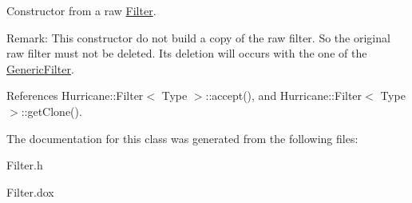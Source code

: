 Constructor from a raw \hyperlink{classHurricane_1_1Filter}{Filter}.

\begin{DoxyParagraph}{Remark\+:}
This constructor do not build a copy of the raw filter. So the original raw filter must not be deleted. It\textquotesingle{}s deletion will occurs with the one of the \hyperlink{classHurricane_1_1GenericFilter}{Generic\+Filter}. 
\end{DoxyParagraph}


References Hurricane\+::\+Filter$<$ Type $>$\+::accept(), and Hurricane\+::\+Filter$<$ Type $>$\+::get\+Clone().



The documentation for this class was generated from the following files\+:\begin{DoxyCompactItemize}
\item 
Filter.\+h\item 
Filter.\+dox\end{DoxyCompactItemize}
